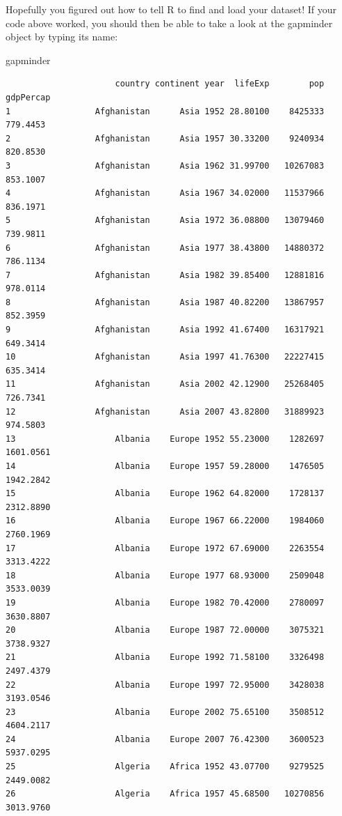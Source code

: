 \documentclass[
  letterpaper,
  DIV=11,
  numbers=noendperiod]{scrreprt}
\newenvironment{Shaded}{\begin{snugshade}}{\end{snugshade}}
\newcommand{\NormalTok}[1]{\textcolor[rgb]{0.00,0.23,0.31}{#1}}
\begin{document}
Hopefully you figured out how to tell R to find and load your dataset!
If your code above worked, you should then be able to take a look at the
gapminder object by typing its name:

\begin{Shaded}
\begin{Highlighting}[]
\NormalTok{gapminder}
\end{Highlighting}
\end{Shaded}

\begin{verbatim}
                      country continent year  lifeExp        pop   gdpPercap
1                 Afghanistan      Asia 1952 28.80100    8425333    779.4453
2                 Afghanistan      Asia 1957 30.33200    9240934    820.8530
3                 Afghanistan      Asia 1962 31.99700   10267083    853.1007
4                 Afghanistan      Asia 1967 34.02000   11537966    836.1971
5                 Afghanistan      Asia 1972 36.08800   13079460    739.9811
6                 Afghanistan      Asia 1977 38.43800   14880372    786.1134
7                 Afghanistan      Asia 1982 39.85400   12881816    978.0114
8                 Afghanistan      Asia 1987 40.82200   13867957    852.3959
9                 Afghanistan      Asia 1992 41.67400   16317921    649.3414
10                Afghanistan      Asia 1997 41.76300   22227415    635.3414
11                Afghanistan      Asia 2002 42.12900   25268405    726.7341
12                Afghanistan      Asia 2007 43.82800   31889923    974.5803
13                    Albania    Europe 1952 55.23000    1282697   1601.0561
14                    Albania    Europe 1957 59.28000    1476505   1942.2842
15                    Albania    Europe 1962 64.82000    1728137   2312.8890
16                    Albania    Europe 1967 66.22000    1984060   2760.1969
17                    Albania    Europe 1972 67.69000    2263554   3313.4222
18                    Albania    Europe 1977 68.93000    2509048   3533.0039
19                    Albania    Europe 1982 70.42000    2780097   3630.8807
20                    Albania    Europe 1987 72.00000    3075321   3738.9327
21                    Albania    Europe 1992 71.58100    3326498   2497.4379
22                    Albania    Europe 1997 72.95000    3428038   3193.0546
23                    Albania    Europe 2002 75.65100    3508512   4604.2117
24                    Albania    Europe 2007 76.42300    3600523   5937.0295
25                    Algeria    Africa 1952 43.07700    9279525   2449.0082
26                    Algeria    Africa 1957 45.68500   10270856   3013.9760

\end{verbatim}
\end{document}
